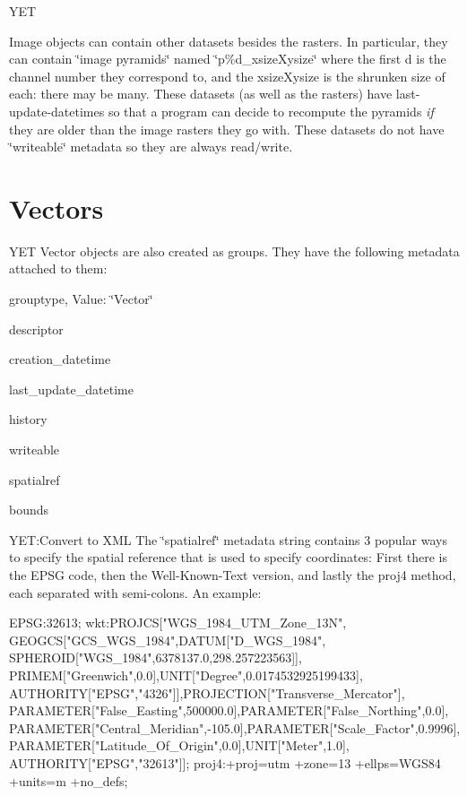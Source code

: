 Y\+E\+T

Image objects can contain other datasets besides the rasters. In particular, they can contain \char`\"{}image pyramids\char`\"{} named {\ttfamily \char`\"{}p\%d\+\_\+xsize\+Xysize\char`\"{}} where the first {\ttfamily d} is the channel number they correspond to, and the xsize\+Xysize is the shrunken size of each\+: there may be many. These datasets (as well as the rasters) have {\ttfamily last-\/update-\/datetime\textquotesingle{}s} so that a program can decide to recompute the pyramids {\itshape if} they are older than the image rasters they go with. These datasets do not have \char`\"{}writeable\char`\"{} metadata so they are always read/write.\hypertarget{file_format_file_format_vectors}{}\section{Vectors}\label{file_format_file_format_vectors}

Y\+E\+T Vector objects are also created as groups. They have the following metadata attached to them\+:

\begin{DoxyItemize}
\item grouptype, Value\+: \char`\"{}\+Vector\char`\"{} \item descriptor \item creation\+\_\+datetime \item last\+\_\+update\+\_\+datetime \item history \item writeable \item spatialref \item bounds\end{DoxyItemize}
Y\+E\+T\+:Convert to X\+M\+L The \char`\"{}spatialref\char`\"{} metadata string contains 3 popular ways to specify the spatial reference that is used to specify coordinates\+: First there is the E\+P\+S\+G code, then the Well-\/\+Known-\/\+Text version, and lastly the proj4 method, each separated with semi-\/colons. An example\+:


\begin{DoxyCode}
EPSG:32613; wkt:PROJCS[\textcolor{stringliteral}{"WGS\_1984\_UTM\_Zone\_13N"},
GEOGCS[\textcolor{stringliteral}{"GCS\_WGS\_1984"},DATUM[\textcolor{stringliteral}{"D\_WGS\_1984"},
SPHEROID[\textcolor{stringliteral}{"WGS\_1984"},6378137.0,298.257223563]],
PRIMEM[\textcolor{stringliteral}{"Greenwich"},0.0],UNIT[\textcolor{stringliteral}{"Degree"},0.0174532925199433],
AUTHORITY[\textcolor{stringliteral}{"EPSG"},\textcolor{stringliteral}{"4326"}]],PROJECTION[\textcolor{stringliteral}{"Transverse\_Mercator"}],
PARAMETER[\textcolor{stringliteral}{"False\_Easting"},500000.0],PARAMETER[\textcolor{stringliteral}{"False\_Northing"},0.0],
PARAMETER[\textcolor{stringliteral}{"Central\_Meridian"},-105.0],PARAMETER[\textcolor{stringliteral}{"Scale\_Factor"},0.9996],
PARAMETER[\textcolor{stringliteral}{"Latitude\_Of\_Origin"},0.0],UNIT[\textcolor{stringliteral}{"Meter"},1.0],
AUTHORITY[\textcolor{stringliteral}{"EPSG"},\textcolor{stringliteral}{"32613"}]]; 
proj4:+proj=utm +zone=13 +ellps=WGS84 +units=m +no\_defs;
\end{DoxyCode}


